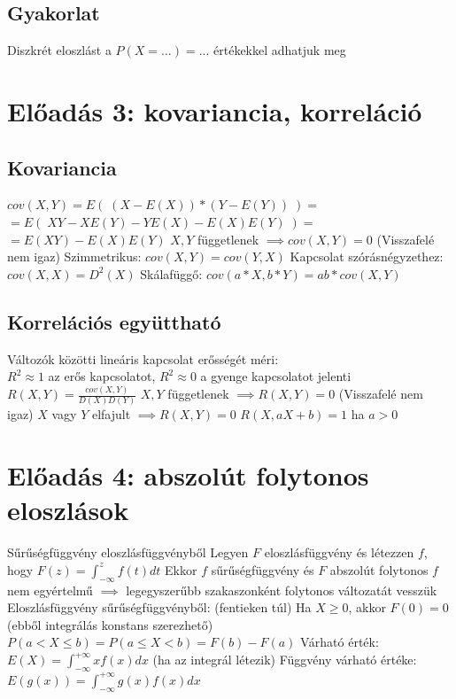 \documentclass[12pt,a4paper]{article}
\begin{document}
\subsection{Gyakorlat}

\begin{outline}
	\1 Diszkrét eloszlást a $P(X=...)=...$ értékekkel adhatjuk meg
\end{outline}

\pagebreak

\section{Előadás 3: kovariancia, korreláció}

\subsection{Kovariancia}

\begin{outline}
	\1 $cov(X,Y) = E(\; (X-E(X))*(Y-E(Y)) \;) =$\\
	$=E(\; XY - XE(Y) - YE(X) - E(X)E(Y) \;) =$\\
	$=E(XY) - E(X)E(Y)$
	\1 $X,Y$ függetlenek $\implies cov(X,Y) = 0$ \;\; (Visszafelé nem igaz)
	\1 Szimmetrikus: $cov(X,Y)=cov(Y,X)$
	\1 Kapcsolat szórásnégyzethez: $cov(X,X) = D^2(X)$
	\1 Skálafüggő: $cov(a*X, b*Y) = ab*cov(X,Y)$
\end{outline}

\subsection{Korrelációs együttható}

\begin{outline}
	\1 Változók közötti lineáris kapcsolat erősségét méri:\\
	$R^2 \approx 1$ az erős kapcsolatot, $R^2 \approx 0$ a gyenge kapcsolatot jelenti
	\1 $R(X,Y) = \frac{cov(X,Y)}{D(X)D(Y)}$
	\1 $X,Y$ függetlenek $\implies R(X,Y) = 0$ \;\; (Visszafelé nem igaz)
	\1 $X$ vagy $Y$ elfajult $\implies R(X,Y)=0$
	\1 $R(X,aX+b) = 1$ ha $a>0$
\end{outline}

\pagebreak

\section{Előadás 4: abszolút folytonos eloszlások}

\begin{outline}
	\1 Sűrűségfüggvény eloszlásfüggvényből
		\2 Legyen $F$ eloszlásfüggvény és létezzen $f$, hogy $F(z) = \int_{-\infty}^{z}f(t)dt$
		\2 Ekkor $f$ sűrűségfüggvény és $F$ abszolút folytonos
		\2 $f$ nem egyértelmű $\implies$ legegyszerűbb szakaszonként folytonos változatát vesszük
	\1 Eloszlásfüggvény sűrűségfüggvényből: (fentieken túl)
		\2 Ha $X \ge 0$, akkor $F(0)=0$ (ebből integrálás konstans szerezhető)
	\1 $P(a < X \le b) = P(a \le X < b) = F(b) - F(a)$
	\1 Várható érték: $E(X) = \int_{-\infty}^{+\infty}xf(x)dx$ (ha az integrál létezik)
		\2 Függvény várható értéke: $E(g(x)) = \int_{-\infty}^{+\infty}g(x)f(x)dx$
\end{outline}
\end{document}

